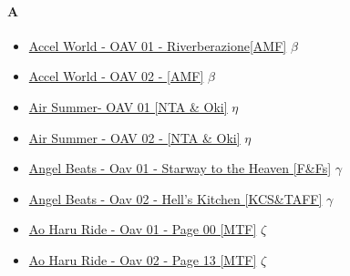 		\paragraph{A} \hypertarget{OA}{}
			\begin{itemize}
				\item \href{https://mega.nz/#!n8JFiIwI!Vl8cz8o5XK1SDiS2gzKbugfLTAt3qPdHDudG6VTz9A0} {Accel World - OAV 01 - Riverberazione[AMF]}  $\beta$  \\ 
				\item \href{https://mega.nz/#!3pYG3JpB!h4PPWiblJ0l0oYsjfb1x1MTXIaVUYc0tgHeqKDMFUgk} {Accel World - OAV 02 - [AMF]}  $\beta$  \\ 
				\item \href{https://mega.nz/#!3pYG3JpB!h4PPWiblJ0l0oYsjfb1x1MTXIaVUYc0tgHeqKDMFUgk} {Air Summer- OAV 01 [NTA \& Oki]}  $\eta$  \\ 
				\item \href{https://mega.nz/#!3pYG3JpB!h4PPWiblJ0l0oYsjfb1x1MTXIaVUYc0tgHeqKDMFUgk} {Air Summer - OAV 02 - [NTA \& Oki]}  $\eta$  \\ 
				\item \href{https://mega.nz/#!x45G2IaZ!kuBLw7FqV4edsxykcu-muZthIT6Zw8m7Evh665QAb3g} {Angel Beats - Oav 01 - Starway to the Heaven [F\&Fs]}  $\gamma$ \\ 
				\item \href{https://mega.nz/#!k0wmxIQY!Bx8Agx_FdiphE3dqVQmxAY0qERcVw2hwuIQieS8Lijo} {Angel Beats - Oav 02 - Hell's Kitchen [KCS\&TAFF]} $\gamma$  \\ 
				\item \href{https://mega.nz/#!W40VHSAT!sriEyY-JZZ7GLEuyH8YPtN4NbfS8zG4GPvKpQaX7PHo} {Ao Haru Ride - Oav 01 - Page 00 [MTF]} $\zeta$  \\ 
				\item \href{https://mega.nz/#!601lSAiJ!_AOKejqGsfeNmq6f1NBJuRZGQbFB7vG05AA_zHgnguE} {Ao Haru Ride - Oav 02 - Page 13 [MTF]} $\zeta$  \\ 
		
			\end{itemize}
			
